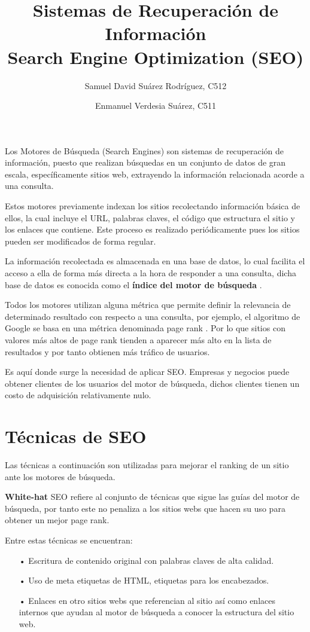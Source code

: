 \documentclass[12pt]{llncs}
\title{Sistemas de Recuperación de Información \\ Search Engine Optimization (SEO)}
\author{
    Samuel David Suárez Rodríguez, C512 \and
    Enmanuel Verdesia Suárez, C511
}
\date{}
\institute{Universidad de La Habana}
\begin{document}
\maketitle

Los Motores de Búsqueda (Search Engines) son sistemas de recuperación de información, puesto que realizan búsquedas en un conjunto de datos de gran escala, específicamente sitios web, extrayendo la información relacionada acorde a una consulta.

Estos motores previamente indexan los sitios recolectando información básica de ellos, la cual incluye el URL, palabras claves, el código que estructura el sitio y los enlaces que contiene. Este proceso es realizado periódicamente pues los sitios pueden ser modificados de forma regular.

La información recolectada es almacenada en una base de datos, lo cual facilita el acceso a ella de forma más directa a la hora de responder a una consulta, dicha base de datos es conocida como el \textbf{índice del motor de búsqueda} \cite{what_is_seo}.

Todos los motores utilizan alguna métrica que permite definir la relevancia de determinado resultado con respecto a una consulta, por ejemplo, el algoritmo de Google se basa en una métrica denominada page rank \cite{pr}. Por lo que sitios con valores más altos de page rank tienden a aparecer más alto en la lista de resultados y por tanto obtienen más tráfico de usuarios.

Es aquí donde surge la necesidad de aplicar SEO. Empresas y negocios puede obtener clientes de los usuarios del motor de búsqueda, dichos clientes tienen un costo de adquisición relativamente nulo.

\section{Técnicas de SEO}
Las técnicas a continuación son utilizadas para mejorar el ranking de un sitio ante los motores de búsqueda.

\textbf{White-hat} SEO refiere al conjunto de técnicas que sigue las guías del motor de búsqueda, por tanto este no penaliza a los sitios webs que hacen su uso para obtener un mejor page rank.

Entre estas técnicas se encuentran:
\begin{itemize}
    \item[•] Escritura de contenido original con palabras claves de alta calidad.
    \item[•] Uso de meta etiquetas de HTML, etiquetas para los encabezados.
    \item[•] Enlaces en otro sitios webs que referencian al sitio así como enlaces internos que ayudan al motor de búsqueda a conocer la estructura del sitio web.
\end{itemize}
\end{document}
